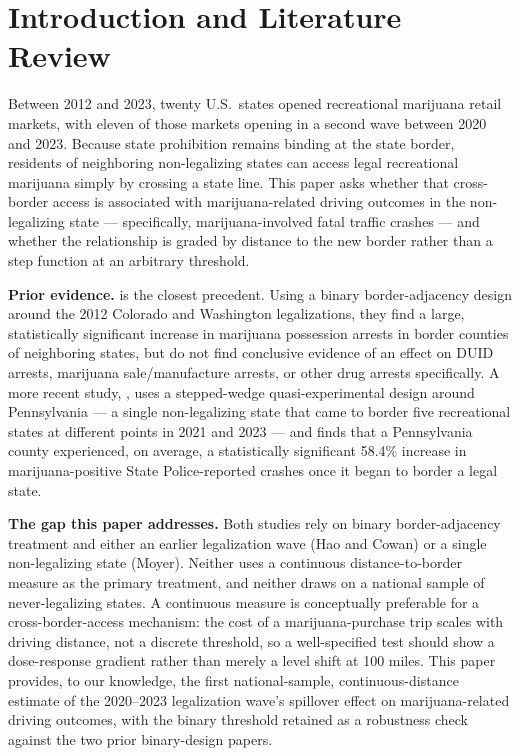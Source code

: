 \documentclass[11pt]{article}
\begin{document}
\section{Introduction and Literature Review}

Between 2012 and 2023, twenty U.S.\ states opened recreational marijuana
retail markets, with eleven of those markets opening in a second wave
between 2020 and 2023. Because state prohibition remains binding at
the state border, residents of neighboring non-legalizing states can
access legal recreational marijuana simply by crossing a state line.
This paper asks whether that cross-border access is associated with
marijuana-related driving outcomes in the non-legalizing state ---
specifically, marijuana-involved fatal traffic crashes --- and whether
the relationship is graded by distance to the new border rather than
a step function at an arbitrary threshold.

\textbf{Prior evidence.} \citet{HaoCowan2020} is the closest precedent.
Using a binary border-adjacency design around the 2012 Colorado and
Washington legalizations, they find a large, statistically significant
increase in marijuana possession arrests in border counties of
neighboring states, but do not find conclusive evidence of an effect
on DUID arrests, marijuana sale/manufacture arrests, or other drug
arrests specifically. A more recent study, \citet{Moyer2026}, uses a
stepped-wedge quasi-experimental design around Pennsylvania --- a
single non-legalizing state that came to border five recreational
states at different points in 2021 and 2023 --- and finds that a
Pennsylvania county experienced, on average, a statistically
significant 58.4\% increase in marijuana-positive State Police-reported
crashes once it began to border a legal state.

\textbf{The gap this paper addresses.} Both studies rely on binary
border-adjacency treatment and either an earlier legalization wave
(Hao and Cowan) or a single non-legalizing state (Moyer). Neither uses
a continuous distance-to-border measure as the primary treatment, and
neither draws on a national sample of never-legalizing states. A
continuous measure is conceptually preferable for a cross-border-access
mechanism: the cost of a marijuana-purchase trip scales with driving
distance, not a discrete threshold, so a well-specified test should
show a dose-response gradient rather than merely a level shift at 100
miles. This paper provides, to our knowledge, the first
national-sample, continuous-distance estimate of the 2020--2023
legalization wave's spillover effect on marijuana-related driving
outcomes, with the binary threshold retained as a robustness check
against the two prior binary-design papers.
\end{document}
